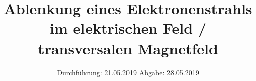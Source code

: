 

\subject{V501/2}
\title{Ablenkung eines Elektronenstrahls im elektrischen Feld / transversalen Magnetfeld}
\date{
  Durchführung: 21.05.2019
  \hspace{3em}
  Abgabe: 28.05.2019
}


\maketitle
\thispagestyle{empty}
\tableofcontents
\newpage

%


%
%
%

\nocite{*}
\printbibliography

